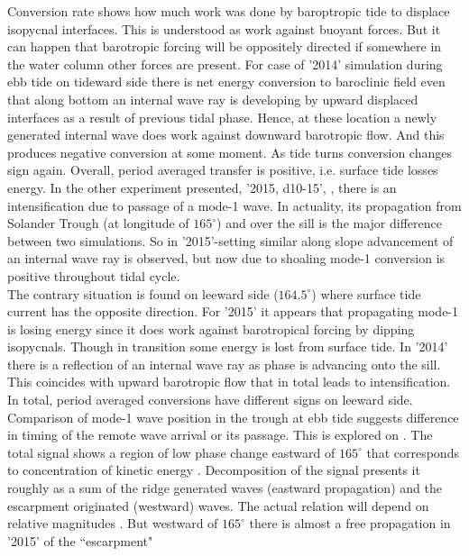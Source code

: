 \documentclass[12pt]{article}
\begin{document}
Conversion rate shows how much work was done by baroptropic tide to displace isopycnal interfaces. 
This is understood as work against buoyant forces. But it can happen that barotropic forcing will 
be oppositely directed if somewhere in the water column other forces are present. For case of 
'2014' 
simulation  during ebb tide on tideward side there is net energy 
conversion to baroclinic field even that along bottom an internal wave ray is developing by upward 
displaced interfaces as a result of previous tidal phase. Hence, at these location a newly 
generated internal wave does work against downward barotropic flow. And this produces negative 
conversion  at some moment. As tide turns conversion changes sign 
again. Overall, period averaged transfer is positive, i.e. surface tide losses energy. In 
the other experiment presented, '2015, d10-15', , there is an 
intensification 
due to passage of a mode-1 wave. In actuality, its propagation from Solander Trough 
(at longitude of $165^{\circ}$) and over the sill is the major difference between two simulations. 
So in '2015'-setting similar along slope advancement of an internal wave ray is observed, but now 
due to shoaling mode-1 
conversion is positive throughout tidal cycle.\\
The contrary situation is found on leeward side ($164.5^{\circ}$) where surface tide current has the
opposite direction. For '2015' it appears that propagating mode-1 is losing energy since it does 
work against barotropical forcing by dipping isopycnals. Though in transition some energy is lost 
from surface tide. In '2014' there is a reflection of an internal wave ray as phase is advancing 
onto the sill. This coincides with upward barotropic flow that in total leads to intensification. 
In total, period averaged conversions have different signs on leeward side. Comparison of mode-1 
wave 
position in the trough at ebb tide  suggests difference in timing of 
the 
remote wave arrival or its passage. This is explored on . The total 
signal shows a region of low phase change eastward of $165^{\circ}$ that corresponds to 
concentration of kinetic energy . Decomposition of the signal 
presents 
it roughly as a sum of the ridge generated waves (eastward propagation) and the escarpment 
originated (westward) waves. The actual relation will depend on relative magnitudes 
\citep{martini2007diagnosing}. 
But westward of $165^{\circ}$ there is almost a free propagation in '2015' of the ``escarpment" 
\end{document}
